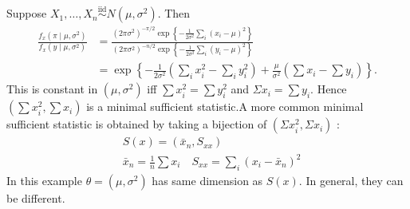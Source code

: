 \documentclass[egregdoesnotlikesansseriftitles,a4paper]{scrartcl}
\begin{document}
\begin{example*}
      Suppose $X_1 , \ldots ,X_n \overset{\operatorname{iid}}{\sim} N (\mu, \sigma^2)$. Then 
      \begin{align*}
          \frac{f_{x}\left(\pi \mid \mu, \sigma^{2}\right)}{f_{x}\left(y \mid \mu, \sigma^{2}\right)}&=\frac{\left(2 \pi \sigma^{2}\right)^{-\pi / 2} \exp \left\{-\frac{1}{2 \sigma^{2}} \sum_{i}\left(x_{i}-\mu\right)^{2}\right\}}{\left(2 \pi \sigma^{2}\right)^{-n / 2} \exp \left\{-\frac{1}{2 \sigma^{2}} \sum_{i}\left(y_{i}-\mu\right)^{2}\right\}}\\
          &=\exp \left\{-\frac{1}{2 \sigma^{2}}\left(\sum_{i} x_{i}^{2}-\sum_{i} y_{i}^{2}\right)+\frac{\mu}{\sigma^{2}}\left(\sum x_{i}-\sum y_{i}\right)\right\}.
      \end{align*}
      This is constant in $\left(\mu, \sigma^{2}\right)$ iff $\sum x_{i}^{2}=\sum y_{i}^{2}$ and $\Sigma x_{i}=\sum y_{i}$. Hence $\left(\sum x_{i}^{2}, \sum x_{i}\right)$ is a minimal sufficient statistic.A more common minimal sufficient statistic is obtained by taking a bijection of $\left(\Sigma x_{i}^{2}, \Sigma x_{i}\right)$ :
     $$
     \begin{aligned}
     &S(x)=\left(\bar{x}_{n}, S_{x x}\right) \\
     &\bar{x}_{n}=\frac{1}{n} \sum x_{i} \quad S_{x x}=\sum_{i}\left(x_{i}-\bar{x}_{n}\right)^{2}
     \end{aligned}
     $$
In this example $\theta=\left(\mu, \sigma^{2}\right)$ has same dimension as $S(x)$. In general, they can be different.
\end{example*}
\end{document}
